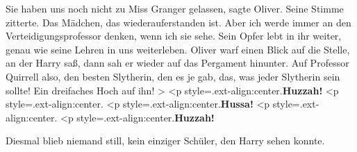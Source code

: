 \glqq{}Sie haben uns noch nicht zu Miss Granger gelassen\grqq{}, sagte Oliver.
Seine Stimme zitterte. \glqq{}Das Mädchen, das wiederauferstanden ist. Aber ich
werde immer an den Verteidigungsprofessor denken, wenn ich sie sehe. Sein Opfer
lebt in ihr weiter, genau wie seine Lehren in uns weiterleben.\grqq{} Oliver
warf einen Blick auf die Stelle, an der Harry saß, dann sah er wieder auf das
Pergament hinunter. \glqq{}Auf Professor Quirrell also, den besten Slytherin, den
es je gab, das, was jeder Slytherin sein sollte! Ein dreifaches Hoch auf
ihn!\grqq{}  > <p
style=\grqq{}.ext-align:center\grqq{}.\textbf{\glqq{}Huzzah!}   <p
style=\grqq{}.ext-align:center\grqq{}.  <p
style=\grqq{}.ext-align:center\grqq{}.\textbf{Hussa!}   <p
style=\grqq{}.ext-align:center\grqq{}.  <p
style=\grqq{}.ext-align:center\grqq{}.\textbf{Huzzah!\grqq{}}

Diesmal blieb niemand still, kein einziger Schüler, den Harry sehen konnte.

